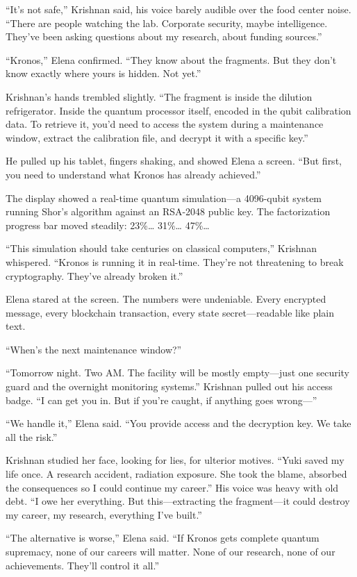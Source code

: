 ``It's not safe,'' Krishnan said, his voice barely audible over the food center noise. ``There are people watching the lab. Corporate security, maybe intelligence. They've been asking questions about my research, about funding sources.''

``Kronos,'' Elena confirmed. ``They know about the fragments. But they don't know exactly where yours is hidden. Not yet.''

Krishnan's hands trembled slightly. ``The fragment is inside the dilution refrigerator. Inside the quantum processor itself, encoded in the qubit calibration data. To retrieve it, you'd need to access the system during a maintenance window, extract the calibration file, and decrypt it with a specific key.''

He pulled up his tablet, fingers shaking, and showed Elena a screen. ``But first, you need to understand what Kronos has already achieved.''

The display showed a real-time quantum simulation---a 4096-qubit system running Shor's algorithm against an RSA-2048 public key. The factorization progress bar moved steadily: 23\%\ldots{} 31\%\ldots{} 47\%\ldots{}

``This simulation should take centuries on classical computers,'' Krishnan whispered. ``Kronos is running it in real-time. They're not threatening to break cryptography. They've already broken it.''

Elena stared at the screen. The numbers were undeniable. Every encrypted message, every blockchain transaction, every state secret---readable like plain text.

``When's the next maintenance window?''

``Tomorrow night. Two AM. The facility will be mostly empty---just one security guard and the overnight monitoring systems.'' Krishnan pulled out his access badge. ``I can get you in. But if you're caught, if anything goes wrong---''

``We handle it,'' Elena said. ``You provide access and the decryption key. We take all the risk.''

Krishnan studied her face, looking for lies, for ulterior motives. ``Yuki saved my life once. A research accident, radiation exposure. She took the blame, absorbed the consequences so I could continue my career.'' His voice was heavy with old debt. ``I owe her everything. But this---extracting the fragment---it could destroy my career, my research, everything I've built.''

``The alternative is worse,'' Elena said. ``If Kronos gets complete quantum supremacy, none of our careers will matter. None of our research, none of our achievements. They'll control it all.''

